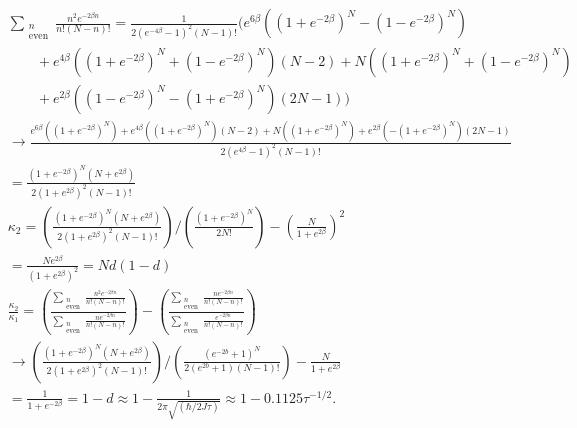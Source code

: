 \documentclass{article}
\begin{document}
\begin{align*}
     & \sum_{\substack{n                                                                                                                                                                      \\ \text{even}}} \frac{n^2 e^{-2\beta n}}{n!(N-n)!} = \frac{1}{2(e^{-4\beta}-1)^2 (N-1)!} \Biggl(e^{6\beta} ((1+e^{-2\beta})^N-(1-e^{-2\beta})^N) \\
     & \qquad + e^{4\beta} ((1+e^{-2\beta})^N+(1-e^{-2\beta})^N)(N-2) + N((1+e^{-2\beta})^N+(1-e^{-2\beta})^N)                                                                                \\
     & \qquad + e^{2\beta} ((1-e^{-2\beta})^N-(1+e^{-2\beta})^N)(2N-1) \Biggr)                                                                                                                \\
     & \rightarrow \frac{e^{6\beta} ((1+e^{-2\beta})^N) + e^{4\beta} ((1+e^{-2\beta})^N)(N-2) + N((1+e^{-2\beta})^N) + e^{2\beta} (-(1+e^{-2\beta})^N)(2N-1)}{2(e^{4\beta}-1)^2 (N-1)!}       \\
     & = \frac{(1+e^{-2\beta})^N (N+e^{2\beta})}{2(1+e^{2\beta})^2 (N-1)!}                                                                                                                    \\
     & \kappa_2 = \left(\frac{(1+e^{-2\beta})^N (N+e^{2\beta})}{2(1+e^{2\beta})^2 (N-1)!}\right) \bigg/ \left(\frac{(1+e^{-2\beta})^N}{2N!}\right) - \left(\frac{N}{1+e^{2\beta}}\right)^2    \\
     & = \frac{Ne^{2\beta}}{(1+e^{2\beta})^2} = Nd(1-d)                                                                                                                                       \\
     & \frac{\kappa_2}{\kappa_1} = \left(\frac{\sum_{\substack{n                                                                                                                              \\ \text{even}}} \frac{n^2 e^{-2\beta n}}{n!(N-n)!}}{\sum_{\substack{n \\ \text{even}}} \frac{ne^{-2\beta n}}{n!(N-n)!}}\right) - \left(\frac{\sum_{\substack{n \\ \text{even}}} \frac{ne^{-2\beta n}}{n!(N-n)!}}{\sum_{\substack{n \\ \text{even}}} \frac{e^{-2\beta n}}{n!(N-n)!}}\right) \\
     & \rightarrow \left(\frac{(1+e^{-2\beta})^N (N+e^{2\beta})}{2(1+e^{2\beta})^2 (N-1)!}\right) \bigg/ \left(\frac{(e^{-2 b} + 1)^N}{2 (e^{2b}+ 1)(N - 1)!}\right) - \frac{N}{1+e^{2\beta}} \\
     & = \frac{1}{1+e^{-2\beta}} = 1-d \approx 1- \frac{1}{2\pi \sqrt{(\hbar/2J\tau)}} \approx 1-0.1125\tau^{-1/2}.
\end{align*}
\end{document}
